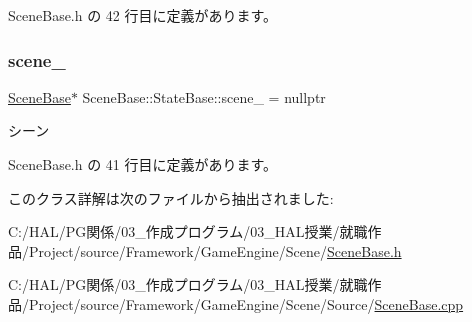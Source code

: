  Scene\+Base.\+h の 42 行目に定義があります。

\mbox{\label{class_scene_base_1_1_state_base_ae1062afb3f96664e24504151eaccf40f}} 
\subsubsection{\texorpdfstring{scene\+\_\+}{scene\_}}
{\footnotesize\ttfamily \mbox{\hyperlink{class_scene_base}{Scene\+Base}}$\ast$ Scene\+Base\+::\+State\+Base\+::scene\+\_\+ = nullptr\hspace{0.3cm}{\ttfamily [private]}}



シーン 



 Scene\+Base.\+h の 41 行目に定義があります。



このクラス詳解は次のファイルから抽出されました\+:\begin{DoxyCompactItemize}
\item 
C\+:/\+H\+A\+L/\+P\+G関係/03\+\_\+作成プログラム/03\+\_\+\+H\+A\+L授業/就職作品/\+Project/source/\+Framework/\+Game\+Engine/\+Scene/\mbox{\hyperlink{_scene_base_8h}{Scene\+Base.\+h}}\item 
C\+:/\+H\+A\+L/\+P\+G関係/03\+\_\+作成プログラム/03\+\_\+\+H\+A\+L授業/就職作品/\+Project/source/\+Framework/\+Game\+Engine/\+Scene/\+Source/\mbox{\hyperlink{_scene_base_8cpp}{Scene\+Base.\+cpp}}\end{DoxyCompactItemize}
